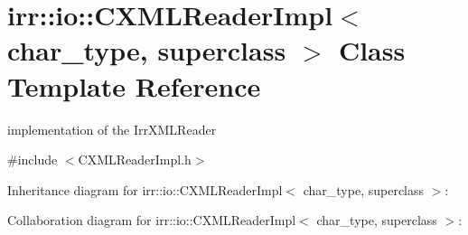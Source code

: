 \hypertarget{classirr_1_1io_1_1_c_x_m_l_reader_impl}{\section{irr\+:\+:io\+:\+:C\+X\+M\+L\+Reader\+Impl$<$ char\+\_\+type, superclass $>$ Class Template Reference}
\label{classirr_1_1io_1_1_c_x_m_l_reader_impl}
}


implementation of the Irr\+X\+M\+L\+Reader  




{\ttfamily \#include $<$C\+X\+M\+L\+Reader\+Impl.\+h$>$}



Inheritance diagram for irr\+:\+:io\+:\+:C\+X\+M\+L\+Reader\+Impl$<$ char\+\_\+type, superclass $>$\+:


Collaboration diagram for irr\+:\+:io\+:\+:C\+X\+M\+L\+Reader\+Impl$<$ char\+\_\+type, superclass $>$\+:
